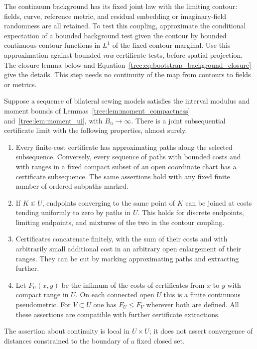 The continuum background has its fixed joint law with the limiting
contour: fields, curve, reference metric, and residual embedding or
imaginary-field randomness are all retained. To test this coupling,
approximate the conditional expectation of a bounded background test
given the contour by bounded continuous contour functions in $L^1$ of
the fixed contour marginal. Use this approximation against bounded
\emph{raw} certificate tests, before spatial projection. The closure
lemma below and Equation~\eqref{tree:eq:bootstrap_background_closure}
give the details. This step needs no continuity of the map from
contours to fields or metrics.

\begin{proposition}\label{tree:prop:certificate_limit}
Suppose a sequence of bilateral sewing models satisfies the interval
modulus and moment bounds of Lemmas~\ref{tree:lem:moment_compactness}
and~\ref{tree:lem:moment_ui}, with $B_n\to\infty$.  There is a joint subsequential
certificate limit with the following properties, almost surely.
\begin{enumerate}
\item Every finite-cost certificate has approximating paths along the
selected subsequence.  Conversely, every sequence of paths with bounded
costs and with ranges in a fixed compact subset of an open coordinate
chart has a certificate subsequence.  The same assertions hold with any
fixed finite number of ordered subpaths marked.
\item If $K\Subset U$, endpoints converging to the same point of $K$ can
be joined at costs tending uniformly to zero by paths in $U$.  This holds
for discrete endpoints, limiting endpoints, and mixtures of the two in
the contour coupling.
\item Certificates concatenate finitely, with the sum of their costs
and with arbitrarily small additional cost in an arbitrary open
enlargement of their ranges.  They can be cut by marking approximating
paths and extracting further.
\item Let $F_U(x,y)$ be the infimum of the costs of certificates from
$x$ to $y$ with compact range in $U$.  On each connected open $U$ this
is a finite continuous pseudometric.  For $V\subset U$ one has
$F_U\leq F_V$ wherever both are defined.  All these assertions are
compatible with further certificate extractions.
\end{enumerate}
The assertion about continuity is local in $U\times U$; it does not assert
convergence of distances constrained to the boundary of a fixed closed set.
\end{proposition}

